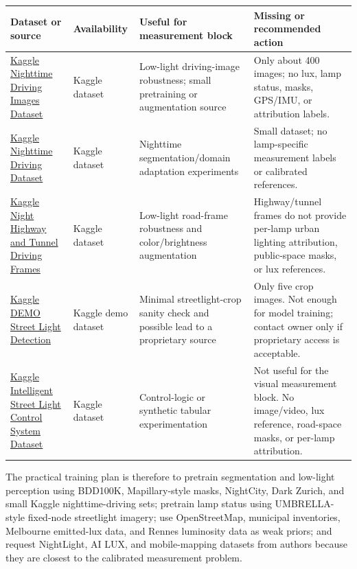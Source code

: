 \documentclass[11pt]{article}
\begin{document}
\begin{center}
\begin{tabularx}{\textwidth}{>{\raggedright\arraybackslash}p{}>{\raggedright\arraybackslash}p{}>{\raggedright\arraybackslash}X>{\raggedright\arraybackslash}p{}}
\toprule
Dataset or source & Availability & Useful for measurement block & Missing or recommended action \\
\midrule
\href{https://www.kaggle.com/datasets/adembakrc/nighttime-driving}{Kaggle Nighttime Driving Images Dataset} & Kaggle dataset & Low-light driving-image robustness; small pretraining or augmentation source & Only about 400 images; no lux, lamp status, masks, GPS/IMU, or attribution labels. \\
\href{https://www.kaggle.com/datasets/ipythonx/nighttime-driving-dataset}{Kaggle Nighttime Driving Dataset} & Kaggle dataset & Nighttime segmentation/domain adaptation experiments & Small dataset; no lamp-specific measurement labels or calibrated references. \\
\href{https://www.kaggle.com/datasets/prefoxideas/night-highway-and-tunnel-driving-frames-dataset}{Kaggle Night Highway and Tunnel Driving Frames} & Kaggle dataset & Low-light road-frame robustness and color/brightness augmentation & Highway/tunnel frames do not provide per-lamp urban lighting attribution, public-space masks, or lux references. \\
\href{https://www.kaggle.com/datasets/notitltd/demo-street-light-detection-5-crop-images-and-data}{Kaggle DEMO Street Light Detection} & Kaggle demo dataset & Minimal streetlight-crop sanity check and possible lead to a proprietary source & Only five crop images. Not enough for model training; contact owner only if proprietary access is acceptable. \\
\href{https://www.kaggle.com/datasets/zunairashakeel08/intelligent-street-light-control-system-dataset}{Kaggle Intelligent Street Light Control System Dataset} & Kaggle dataset & Control-logic or synthetic tabular experimentation & Not useful for the visual measurement block. No image/video, lux reference, road-space masks, or per-lamp attribution. \\
\bottomrule
\end{tabularx}
\end{center}
\endgroup

The practical training plan is therefore to pretrain segmentation and low-light perception using BDD100K, Mapillary-style masks, NightCity, Dark Zurich, and small Kaggle nighttime-driving sets; pretrain lamp status using UMBRELLA-style fixed-node streetlight imagery; use OpenStreetMap, municipal inventories, Melbourne emitted-lux data, and Rennes luminosity data as weak priors; and request NightLight, AI LUX, and mobile-mapping datasets from authors because they are closest to the calibrated measurement problem.
\end{document}
